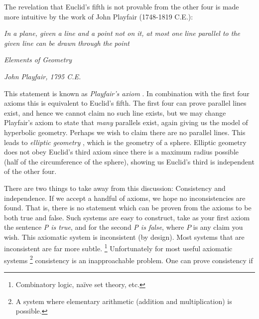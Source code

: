         The revelation that Euclid's fifth is not provable from the other four
        is made more intuitive by the work of John
        Playfair (1748-1819 C.E.):
        \begin{center}
            \textit{In a plane, given a line and a point not on it, at most one}
            \textit{line parallel to the given line can be drawn through the}
            \textit{point}
            \par
            \hfill\textit{Elements of Geometry}\par
            \hfill\textit{John Playfair, 1795 C.E.}
        \end{center}
        This statement is known as \textit{Playfair's axiom}%
        . In combination with the first four axioms this
        is equivalent to Euclid's fifth. The first four can prove parallel lines
        exist, and hence we cannot claim no such line exists, but we may change
        Playfair's axiom to state that \textit{many} parallels exist, again
        giving us the model of hyperbolic geometry. Perhaps we wish to claim
        there are no parallel lines. This leads to \textit{elliptic geometry}%
        , which is the
        geometry of a sphere. Elliptic geometry does not obey Euclid's third
        axiom since there is a maximum radius possible (half of the
        circumference of the sphere), showing us Euclid's third is independent
        of the other four.
        \par\hfill\par
        There are two things to take away from this discussion: Consistency and
        independence. If we accept a handful of axioms, we hope no
        inconsistencies are found. That is, there is no statement which can be
        proven from the axioms to be both true and false. Such systems are easy
        to construct, take as your first axiom the sentence \textit{P is true},
        and for the second \textit{P is false}, where $P$ is any claim you wish.
        This axiomatic system is inconsistent (by design). Most systems that are
        inconsistent are far more subtle.%
        \footnote{%
            Combinatory logic, na\"{i}ve set theory, etc.
        }
        Unfortunately for most useful axiomatic systems%
        \footnote{%
            A system where elementary arithmetic (addition and multiplication)
            is possible.
        }
        consistency is an inapproachable problem. One can prove consistency if
